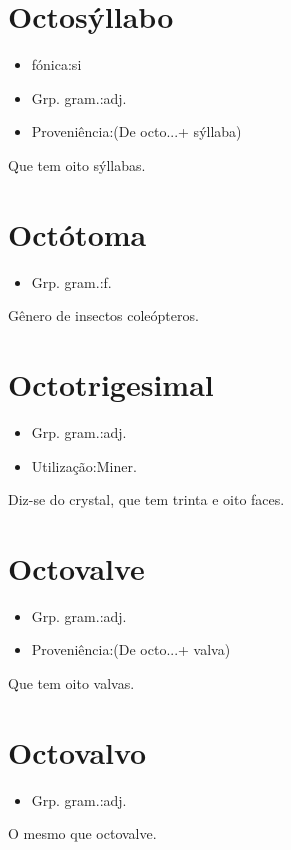 \section{Octosýllabo}
\begin{itemize}
\item {fónica:si}
\end{itemize}
\begin{itemize}
\item {Grp. gram.:adj.}
\end{itemize}
\begin{itemize}
\item {Proveniência:(De \textunderscore octo...\textunderscore  + \textunderscore sýllaba\textunderscore )}
\end{itemize}
Que tem oito sýllabas.
\section{Octótoma}
\begin{itemize}
\item {Grp. gram.:f.}
\end{itemize}
Gênero de insectos coleópteros.
\section{Octotrigesimal}
\begin{itemize}
\item {Grp. gram.:adj.}
\end{itemize}
\begin{itemize}
\item {Utilização:Miner.}
\end{itemize}
Diz-se do crystal, que tem trinta e oito faces.
\section{Octovalve}
\begin{itemize}
\item {Grp. gram.:adj.}
\end{itemize}
\begin{itemize}
\item {Proveniência:(De \textunderscore octo...\textunderscore  + \textunderscore valva\textunderscore )}
\end{itemize}
Que tem oito valvas.
\section{Octovalvo}
\begin{itemize}
\item {Grp. gram.:adj.}
\end{itemize}
O mesmo que \textunderscore octovalve\textunderscore .
